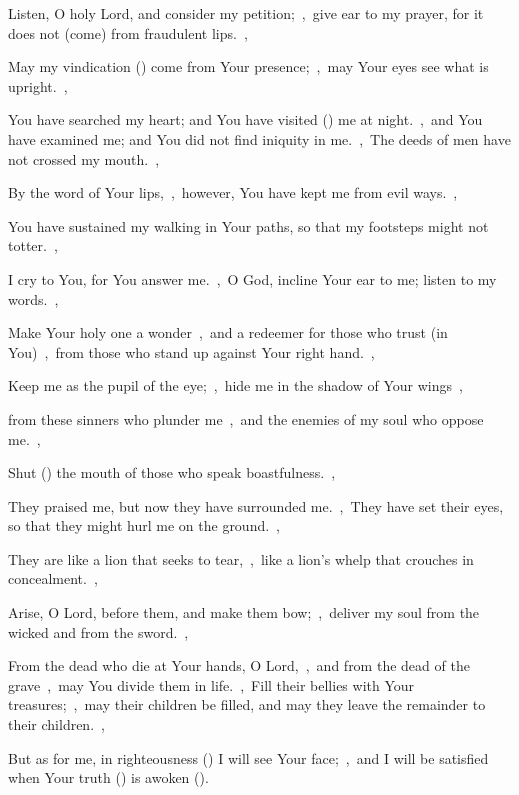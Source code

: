\documentclass[12pt,twoside,a5paper]{article}
\begin{document}
\begin{normalparskip}
  Listen, O holy Lord, and consider my petition;~\sep\ give ear to my prayer, for it does not (come) from fraudulent lips.~\sep


  May my vindication () come from Your presence;~\sep\ may Your eyes see what is upright.~\sep

  You have searched my heart; and You have visited () me at night.~\sep\ and You have examined me; and You did not find iniquity in me.~\sep\ The deeds of men have not crossed my mouth.~\sep

  By the word of Your lips,~\sep\ however, You have kept me from evil ways.~\sep

  You have sustained my walking in Your paths, so that my footsteps might not totter.~\sep

  I cry to You, for You answer me.~\sep\ O God, incline Your ear to me; listen to my words.~\sep

  Make Your holy one a wonder~\sep\ and a redeemer for those who trust (in You)~\sep\ from those who stand up against Your right hand.~\sep

  Keep me as the pupil of the eye;~\sep\ hide me in the shadow of Your wings~\sep

  from these sinners who plunder me~\sep\ and the enemies of my soul who oppose me.~\sep

  Shut () the mouth of those who speak boastfulness.~\sep

  They praised me, but now they have surrounded me.~\sep\ They have set their eyes, so that they might hurl me on the ground.~\sep

  They are like a lion that seeks to tear,~\sep\ like a lion’s whelp that crouches in concealment.~\sep

  Arise, O Lord, before them, and make them bow;~\sep\ deliver my soul from the wicked and from the sword.~\sep

  From the dead who die at Your hands, O Lord,~\sep\ and from the dead of the grave~\sep\ may You divide them in life.~\sep\ Fill their bellies with Your treasures;~\sep\ may their children be filled, and may they leave the remainder to their children.~\sep

  But as for me, in righteousness () I will see Your face;~\sep\ and I will be satisfied when Your truth () is awoken ().
\end{normalparskip}
\end{document}
